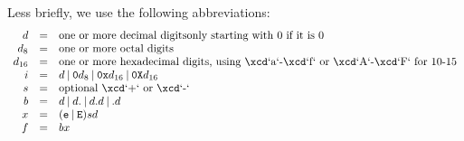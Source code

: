 Less briefly, we use the following abbreviations: 
\begin{displaymath}
\begin{array}{rcll}
d &=& \mbox{one or more decimal digits} \mbox{only starting with 0 if it is 0}\\
d_8 &=& \mbox{one or more octal digits}\\
d_{16} &=& \mbox{one or more hexadecimal digits, using \xcd`a`-\xcd`f`
or \xcd`A`-\xcd`F`
for 10-15}\\
i &=& d  
        \mathbin{|} {\tt 0} d_8 
        \mathbin{|} {\tt 0x} d_{16}
        \mathbin{|} {\tt 0X} d_{16}
\\
s &=& \mbox{optional \xcd`+` or \xcd`-`}\\
b &=& d 
          \mathbin{|} d {\tt .}
          \mathbin{|} d {\tt .} d
          \mathbin{|}  {\tt .} d \\
x &=& ({\tt e } \mathbin{|} {\tt E})
         s
         d \\
f &=& b x
\end{array}
\end{displaymath}

